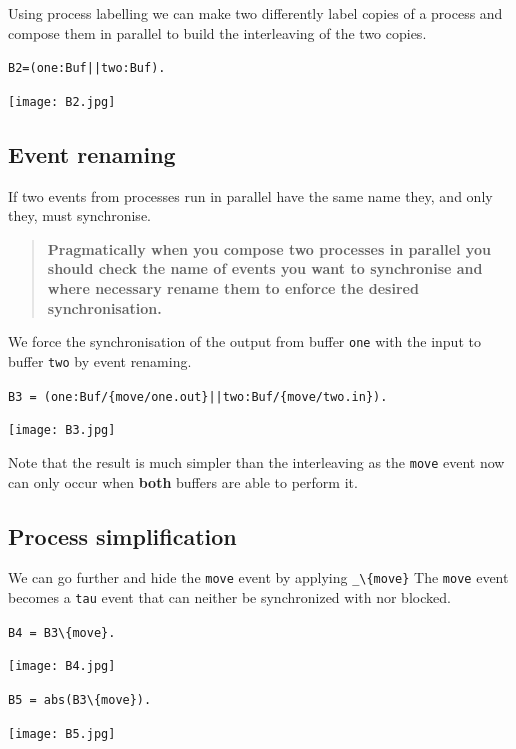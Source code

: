 \documentclass[]{article}
\begin{document}
Using process labelling we can make two differently label copies of a process and compose them in parallel to build the interleaving of the two copies.


\noindent\begin{center}\verb$B2=(one:Buf||two:Buf).$\end{center}

\noindent\begin{center} \texttt{[image: B2.jpg]} \end{center}


\subsection{Event renaming}
If two events from processes run in parallel have the same name they, and only they,  must synchronise.
\begin{quote}
{\bf Pragmatically when you compose two processes in parallel you should check the name of events   you want to   synchronise and where necessary rename them to enforce the desired synchronisation.}
\end{quote}


We force the synchronisation of the output from buffer \verb$one$ with the input to buffer \verb$two$ by event renaming.


\noindent\begin{center}\verb$B3 = (one:Buf/{move/one.out}||two:Buf/{move/two.in}).$\end{center}

\noindent\begin{center} \texttt{[image: B3.jpg]} \end{center}

Note that the result is much simpler than the interleaving as the \verb$move$ event now can only occur when {\bf both} buffers are able to perform it.



\subsection{Process simplification}
We can go further and hide the \verb$move$ event  by applying \verb$_\{move}$ The \verb$move$ event  becomes a \verb$tau$ event that can neither  be synchronized with nor blocked.

\begin{minipage}{0.45\textwidth}
\noindent\begin{center}\verb$B4 = B3\{move}.$

 \texttt{[image: B4.jpg]} \end{center}
 \end{minipage}
\begin{minipage}{0.45\textwidth}
\noindent\begin{center}\verb$B5 = abs(B3\{move}).$

 \texttt{[image: B5.jpg]} \end{center}
 \end{minipage}
\end{document}
